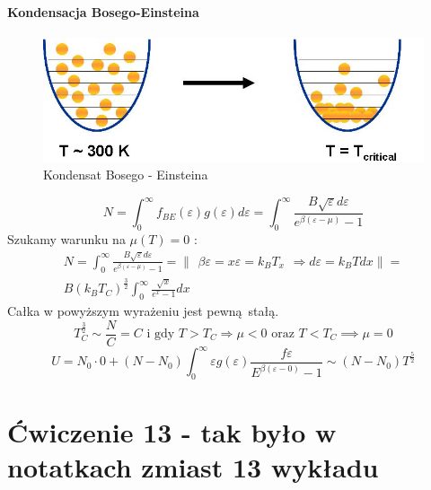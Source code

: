 \documentclass{article}
\begin{document}
		\paragraph{Kondensacja Bosego-Einsteina}
		\begin{figure}[ht]
			\label{fig:fig1}
			\centering
			\includegraphics[scale=0.5]{condense.jpg}
			\caption{Kondensat Bosego - Einsteina}
		\end{figure}
		\begin{equation}
			N = \int_{0}^{\infty}f_{BE}(\varepsilon)g(\varepsilon) d \varepsilon = 
			\int_{0}^{\infty} \frac{B\sqrt{\varepsilon} d \varepsilon}{e^{\beta (\varepsilon - \mu)} - 1}
		\end{equation}
		Szukamy warunku na $ \mu(T) = 0 $ :
		\begin{equation}
		\begin{gathered}
			N = 	\int_{0}^{\infty} \frac{B\sqrt{\varepsilon} d \varepsilon}{e^{\beta (\varepsilon - \mu)} - 1} = 
			\Bigg\| 
			\begin{array}{cc}
			\beta \varepsilon = x 
			\varepsilon = k_BT_x
			\end{array} \Rightarrow 
			d\varepsilon = k_BTdx 
			\Bigg\|	= \\
			B(k_BT_C)^{\frac{3}{2}}\int_{0}^{\infty}\frac{\sqrt{x}}{e^x - 1}dx
		\end{gathered}
		\end{equation}
		Całka w powyższym wyrażeniu jest pewną stałą.
		\begin{equation}
			T_C^{\frac{3}{2}} \sim \frac{N}{C} = C \text{ i gdy } T > T_C \Rightarrow
			\mu < 0 \text{ oraz } T < T_C \implies \mu = 0
 		\end{equation}
		\begin{equation}
			U = N_0 \cdot 0 + (N - N_0) \int_{0}^{\infty} \varepsilon g(\varepsilon) 
			\frac{f \varepsilon}{E^{\beta (\varepsilon - 0)} - 1} \sim (N - N_0)T^{\frac{5}{2}}
		\end{equation}
	\section{Ćwiczenie 13 - tak było w notatkach zmiast 13 wykładu}
\end{document}
